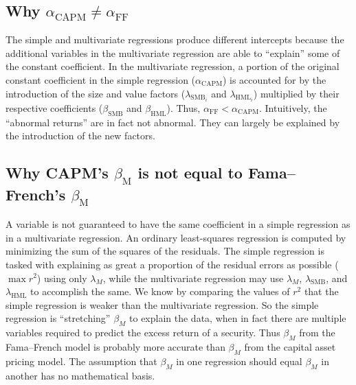 \documentclass[12pt]{article}
\begin{document}
\subsection{Why $\alpha_{\mathrm{CAPM}}\neq\alpha_{\mathrm{FF}}$}
The simple and multivariate regressions produce different intercepts because the additional variables in the multivariate regression are able to ``explain'' some of the constant coefficient. In the multivariate regression, a portion of the original constant coefficient in the simple regression ($\alpha_{\mathrm{CAPM}}$) is accounted for by the introduction of the size and value factors ($\lambda_{{\mathrm{SMB}}_i}$ and $\lambda_{{\mathrm{HML}}_i}$) multiplied by their respective coefficients ($\beta_{\mathrm{SMB}}$ and $\beta_{\mathrm{HML}}$). Thus, $\alpha_{\mathrm{FF}}<\alpha_{\mathrm{CAPM}}$. Intuitively, the ``abnormal returns'' are in fact not abnormal. They can largely be explained by the introduction of the new factors.
\subsection{Why CAPM's $\beta_{\mathrm{M}}$ is not equal to Fama--French's $\beta_{\mathrm{M}}$}
A variable is not guaranteed to have the same coefficient in a simple regression as in a multivariate regression. An ordinary least-squares regression is computed by minimizing the sum of the squares of the residuals. The simple regression is tasked with explaining as great a proportion of the residual errors as possible ($\max{r^2}$) using only $\lambda_M$, while the multivariate regression may use $\lambda_M$, $\lambda_{\mathrm{SMB}}$, and $\lambda_{\mathrm{HML}}$ to accomplish the same. We know by comparing the values of $r^2$ that the simple regression is weaker than the multivariate regression. So the simple regression is ``stretching'' $\beta_M$ to explain the data, when in fact there are multiple variables required to predict the excess return of a security. Thus $\beta_M$ from the Fama--French model is probably more accurate than $\beta_M$ from the capital asset pricing model. The assumption that $\beta_M$ in one regression should equal $\beta_M$ in another has no mathematical basis.
\end{document}
